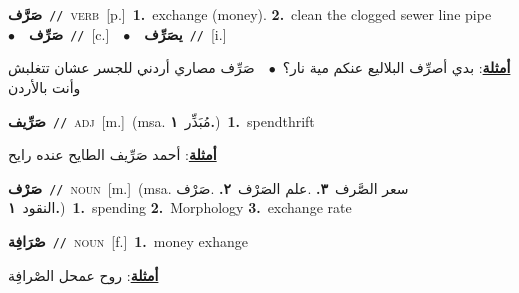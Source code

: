 \documentclass[10pt,a4paper,twoside]{article} %
\begin{document}
\begin{multicols}{2}
{\setlength\topsep{0pt}\textbf{\foreignlanguage{arabic}{صَرَّف}}\ {\color{gray}\texttt{//}\color{black}}\ \textsc{verb}\ [p.]\ \textbf{1.}~exchange (money).  \textbf{2.}~clean the clogged sewer line pipe\ \ $\bullet$\ \ \setlength\topsep{0pt}\textbf{\foreignlanguage{arabic}{صَرِّف}}\ {\color{gray}\texttt{//}\color{black}}\ [c.]\ \ $\bullet$\ \ \setlength\topsep{0pt}\textbf{\foreignlanguage{arabic}{يصَرِّف}}\ {\color{gray}\texttt{//}\color{black}}\ [i.]\  \begin{flushright}\color{gray}\foreignlanguage{arabic}{\textbf{\underline{\foreignlanguage{arabic}{أمثلة}}}: بدي أصرِّف البلاليع عنكم مية نار؟\ $\bullet$\ \  صَرِّف مصاري أردني للجسر عشان تتغلبش وأنت بالأردن}\end{flushright}\color{black}} \vspace{2mm}

{\setlength\topsep{0pt}\textbf{\foreignlanguage{arabic}{صَرِّيف}}\ {\color{gray}\texttt{//}\color{black}}\ \textsc{adj}\ [m.]\ \color{gray}(msa. \foreignlanguage{arabic}{مُبَذِّر}~\foreignlanguage{arabic}{\textbf{١.}})\color{black}\ \textbf{1.}~spendthrift\  \begin{flushright}\color{gray}\foreignlanguage{arabic}{\textbf{\underline{\foreignlanguage{arabic}{أمثلة}}}: أحمد صَرِّيف الطايح عنده رايح}\end{flushright}\color{black}} \vspace{2mm}

{\setlength\topsep{0pt}\textbf{\foreignlanguage{arabic}{صَرْف}}\ {\color{gray}\texttt{//}\color{black}}\ \textsc{noun}\ [m.]\ \color{gray}(msa. \foreignlanguage{arabic}{سعر الصَّرف}~\foreignlanguage{arabic}{\textbf{٣.}}  .\foreignlanguage{arabic}{علم الصَرْف}~\foreignlanguage{arabic}{\textbf{٢.}}  .\foreignlanguage{arabic}{صَرْف النقود}~\foreignlanguage{arabic}{\textbf{١.}})\color{black}\ \textbf{1.}~spending  \textbf{2.}~Morphology  \textbf{3.}~exchange rate\ } \vspace{2mm}

{\setlength\topsep{0pt}\textbf{\foreignlanguage{arabic}{صْرَافِة}}\ {\color{gray}\texttt{//}\color{black}}\ \textsc{noun}\ [f.]\ \textbf{1.}~money exhange\  \begin{flushright}\color{gray}\foreignlanguage{arabic}{\textbf{\underline{\foreignlanguage{arabic}{أمثلة}}}: روح عمحل الصْرافِة}\end{flushright}\color{black}} \vspace{2mm}


\end{multicols}
\end{document}
